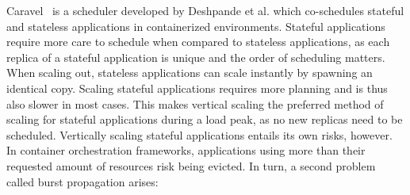 %
Caravel~\citep{caravel} is a scheduler developed by Deshpande et al. which co-schedules stateful and stateless applications in containerized environments. Stateful applications require more care to schedule when compared to stateless applications, as each replica of a stateful application is unique and the order of scheduling matters. When scaling out, stateless applications can scale instantly by spawning an identical copy. Scaling stateful applications requires more planning and is thus also slower in most cases. This makes vertical scaling the preferred method of scaling for stateful applications during a load peak, as no new replicas need to be scheduled. Vertically scaling stateful applications entails its own risks, however. In container orchestration frameworks, applications using more than their requested amount of resources risk being evicted. In turn, a second problem called burst propagation arises: %
%
